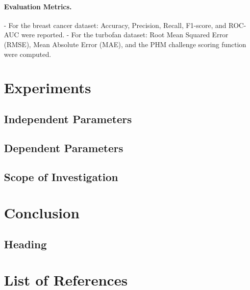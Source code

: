 \documentclass[12pt]{article}
\begin{document}
\paragraph{Evaluation Metrics.}  
- For the breast cancer dataset: Accuracy, Precision, Recall, F1-score, and ROC-AUC were reported.  
- For the turbofan dataset: Root Mean Squared Error (RMSE), Mean Absolute Error (MAE), and the PHM challenge scoring function  were computed.  



\pagebreak
\section{Experiments}

\subsection{Independent Parameters}

\subsection{Dependent Parameters}

\subsection{Scope of Investigation}

\pagebreak
\section{Conclusion}

\subsection{Heading}

\pagebreak
\section*{List of References}
\renewcommand{\thepage}{R-\arabic{page}}

\end{document}
